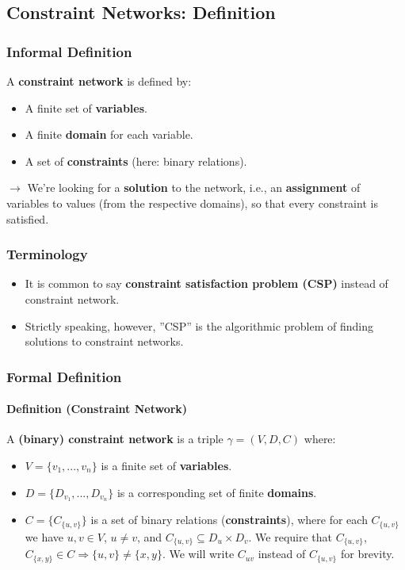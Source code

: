 \documentclass[conference, a4paper]{styles/acmsiggraph}
\newcommand\subsubsubsection{\paragraph}
\begin{document}
    
    \subsection{Constraint Networks: Definition}
        \subsubsection{Informal Definition}
            A \textbf{constraint network} is defined by:
            \begin{itemize}
                \item A finite set of \textbf{variables}.
                \item A finite \textbf{domain} for each variable.
                \item A set of \textbf{constraints} (here: binary relations).
            \end{itemize}
            
            $\rightarrow$ We're looking for a \textbf{solution} to the network, i.e., an \textbf{assignment} of variables to values (from the respective domains), so that every constraint is satisfied.
            
        \subsubsection{Terminology}
            \begin{itemize}
                \item It is common to say \textbf{constraint satisfaction problem (CSP)} instead of constraint network.
                \item Strictly speaking, however, ''CSP'' is the algorithmic problem of finding solutions to constraint networks.
            \end{itemize}
                
        \subsubsection{Formal Definition}
            \subsubsubsection{Definition (Constraint Network)}
                A \textbf{(binary) constraint network} is a triple $\gamma = (V,D,C)$ where:
                    \begin{itemize}
                        \item $V = \{v_1,...,v_n\}$ is a finite set of \textbf{variables}.
                        \item $D = \{D_{v_1},...,D_{v_n}\}$ is a corresponding set of finite \textbf{domains}.
                        \item $C = \{C_{\{u,v\}}\}$ is a set of binary relations (\textbf{constraints}), where for each $C_{\{u,v\}}$ we have $u,v \in V$, $u \neq v$, and $C_{\{u,v\}} \subseteq D_u \times D_v$.
                        We require that $C_{\{u,v\}}$, $C_{\{x,y\}} \in C \Rightarrow \{u,v\} \neq \{x,y\}$.\newline
                        We will write $C_{uv}$ instead of $C_{\{u,v\}}$ for brevity.
                    \end{itemize}
            
\end{document}
